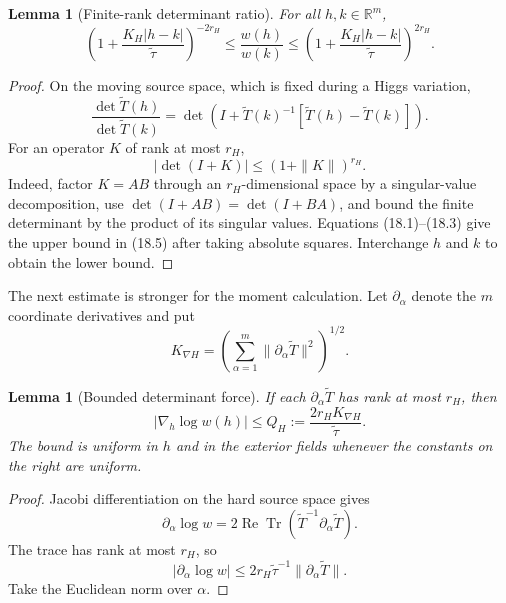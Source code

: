 \documentclass[11pt]{article}
\newtheorem{lemma}[theorem]{Lemma}
\theoremstyle{remark}
\begin{document}
\begin{lemma}[Finite-rank determinant ratio]
\label{lem:v15v18-ratio}
For all \(h,k\in\mathbb R^m\),
\[
 \boxed{
 \left(1+\frac{K_H|h-k|}{\widetilde\tau}\right)^{-2r_H}
 \le\frac{w(h)}{w(k)}
 \le
 \left(1+\frac{K_H|h-k|}{\widetilde\tau}\right)^{2r_H}.}     \tag{18.5}
\]
\end{lemma}

\begin{proof}
On the moving source space, which is fixed during a Higgs
variation,
\[
 \frac{\det\widetilde T(h)}{\det\widetilde T(k)}
 =
 \det\left(
 I+\widetilde T(k)^{-1}
       [\widetilde T(h)-\widetilde T(k)]
 \right).                                                   \tag{18.6}
\]
For an operator \(K\) of rank at most \(r_H\),
\[
 |\det(I+K)|\le(1+\|K\|)^{r_H}.                              \tag{18.7}
\]
Indeed, factor \(K=AB\) through an \(r_H\)-dimensional space by a
singular-value decomposition, use
\(\det(I+AB)=\det(I+BA)\), and bound the finite determinant by the
product of its singular values.  Equations (18.1)--(18.3) give the
upper bound in (18.5) after taking absolute squares.  Interchange
\(h\) and \(k\) to obtain the lower bound.
\end{proof}

The next estimate is stronger for the moment calculation.  Let
\(\partial_\alpha\) denote the \(m\) coordinate derivatives and put
\[
 K_{\nabla H}
 =
 \left(\sum_{\alpha=1}^m
 \|\partial_\alpha\widetilde T\|^2\right)^{1/2}.             \tag{18.8}
\]

\begin{lemma}[Bounded determinant force]
\label{lem:v15v18-force}
If each \(\partial_\alpha\widetilde T\) has rank at most \(r_H\),
then
\[
 \boxed{
 |\nabla_h\log w(h)|
 \le Q_H:=
 \frac{2r_HK_{\nabla H}}{\widetilde\tau}.}                  \tag{18.9}
\]
The bound is uniform in \(h\) and in the exterior fields whenever
the constants on the right are uniform.
\end{lemma}

\begin{proof}
Jacobi differentiation on the hard source space gives
\[
 \partial_\alpha\log w
 =
 2\operatorname{Re}\operatorname{Tr}
 \left(
 \widetilde T^{-1}\partial_\alpha\widetilde T
 \right).                                                   \tag{18.10}
\]
The trace has rank at most \(r_H\), so
\[
 |\partial_\alpha\log w|
 \le
 2r_H\widetilde\tau^{-1}
 \|\partial_\alpha\widetilde T\|.
\]
Take the Euclidean norm over \(\alpha\).
\end{proof}
\end{document}
